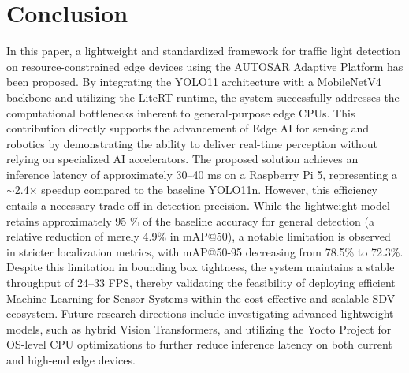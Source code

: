 \section{Conclusion}

In this paper, a lightweight and standardized framework for traffic light detection on resource-constrained edge devices using the AUTOSAR Adaptive Platform has been proposed. By integrating the YOLO11 architecture with a MobileNetV4 backbone and utilizing the LiteRT runtime, the system successfully addresses the computational bottlenecks inherent to general-purpose edge CPUs. This contribution directly supports the advancement of Edge AI for sensing and robotics by demonstrating the ability to deliver real-time perception without relying on specialized AI accelerators. The proposed solution achieves an inference latency of approximately 30--40 ms on a Raspberry Pi 5, representing a $\sim$2.4$\times$ speedup compared to the baseline YOLO11n. However, this efficiency entails a necessary trade-off in detection precision. While the lightweight model retains approximately 95 \% of the baseline accuracy for general detection (a relative reduction of merely 4.9\% in mAP@50), a notable limitation is observed in stricter localization metrics, with mAP@50-95 decreasing from 78.5\% to 72.3\%. Despite this limitation in bounding box tightness, the system maintains a stable throughput of 24--33 FPS, thereby validating the feasibility of deploying efficient Machine Learning for Sensor Systems within the cost-effective and scalable SDV ecosystem. Future research directions include investigating advanced lightweight models, such as hybrid Vision Transformers, and utilizing the Yocto Project for OS-level CPU optimizations to further reduce inference latency on both current and high-end edge devices.